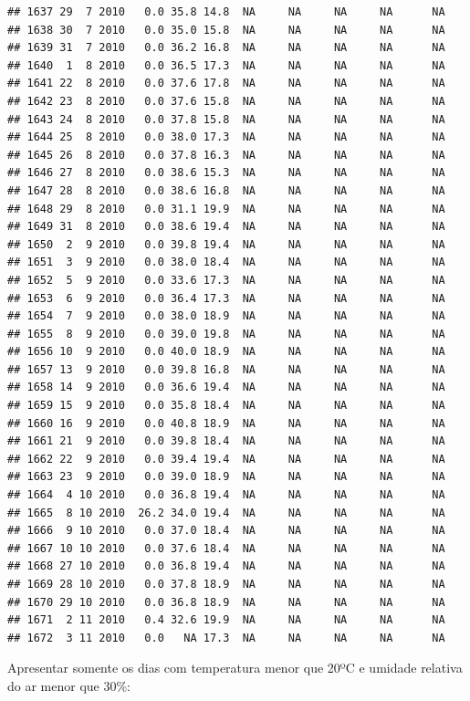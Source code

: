 \documentclass[
]{book}
\begin{document}
\begin{verbatim}
## 1637 29  7 2010   0.0 35.8 14.8  NA     NA     NA     NA      NA
## 1638 30  7 2010   0.0 35.0 15.8  NA     NA     NA     NA      NA
## 1639 31  7 2010   0.0 36.2 16.8  NA     NA     NA     NA      NA
## 1640  1  8 2010   0.0 36.5 17.3  NA     NA     NA     NA      NA
## 1641 22  8 2010   0.0 37.6 17.8  NA     NA     NA     NA      NA
## 1642 23  8 2010   0.0 37.6 15.8  NA     NA     NA     NA      NA
## 1643 24  8 2010   0.0 37.8 15.8  NA     NA     NA     NA      NA
## 1644 25  8 2010   0.0 38.0 17.3  NA     NA     NA     NA      NA
## 1645 26  8 2010   0.0 37.8 16.3  NA     NA     NA     NA      NA
## 1646 27  8 2010   0.0 38.6 15.3  NA     NA     NA     NA      NA
## 1647 28  8 2010   0.0 38.6 16.8  NA     NA     NA     NA      NA
## 1648 29  8 2010   0.0 31.1 19.9  NA     NA     NA     NA      NA
## 1649 31  8 2010   0.0 38.6 19.4  NA     NA     NA     NA      NA
## 1650  2  9 2010   0.0 39.8 19.4  NA     NA     NA     NA      NA
## 1651  3  9 2010   0.0 38.0 18.4  NA     NA     NA     NA      NA
## 1652  5  9 2010   0.0 33.6 17.3  NA     NA     NA     NA      NA
## 1653  6  9 2010   0.0 36.4 17.3  NA     NA     NA     NA      NA
## 1654  7  9 2010   0.0 38.0 18.9  NA     NA     NA     NA      NA
## 1655  8  9 2010   0.0 39.0 19.8  NA     NA     NA     NA      NA
## 1656 10  9 2010   0.0 40.0 18.9  NA     NA     NA     NA      NA
## 1657 13  9 2010   0.0 39.8 16.8  NA     NA     NA     NA      NA
## 1658 14  9 2010   0.0 36.6 19.4  NA     NA     NA     NA      NA
## 1659 15  9 2010   0.0 35.8 18.4  NA     NA     NA     NA      NA
## 1660 16  9 2010   0.0 40.8 18.9  NA     NA     NA     NA      NA
## 1661 21  9 2010   0.0 39.8 18.4  NA     NA     NA     NA      NA
## 1662 22  9 2010   0.0 39.4 19.4  NA     NA     NA     NA      NA
## 1663 23  9 2010   0.0 39.0 18.9  NA     NA     NA     NA      NA
## 1664  4 10 2010   0.0 36.8 19.4  NA     NA     NA     NA      NA
## 1665  8 10 2010  26.2 34.0 19.4  NA     NA     NA     NA      NA
## 1666  9 10 2010   0.0 37.0 18.4  NA     NA     NA     NA      NA
## 1667 10 10 2010   0.0 37.6 18.4  NA     NA     NA     NA      NA
## 1668 27 10 2010   0.0 36.8 19.4  NA     NA     NA     NA      NA
## 1669 28 10 2010   0.0 37.8 18.9  NA     NA     NA     NA      NA
## 1670 29 10 2010   0.0 36.8 18.9  NA     NA     NA     NA      NA
## 1671  2 11 2010   0.4 32.6 19.9  NA     NA     NA     NA      NA
## 1672  3 11 2010   0.0   NA 17.3  NA     NA     NA     NA      NA
\end{verbatim}

Apresentar somente os dias com temperatura menor que 20ºC e umidade relativa do ar menor que 30\%:
\end{document}
